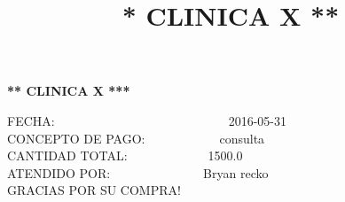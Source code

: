 \documentclass[10pt,a4paper]{letter}
\title{\bf ** CLINICA X **}
\begin{document}
\begin{center}
{\scshape\LARGE \bf *** CLINICA X ***\par}

\end{center}

FECHA:\ \ \ \ \ \ \ \ \ \ \ \ \ \ \ \ \ \ \ \ \ \ \ \ \ \ \ \ 2016-05-31 \\
CONCEPTO DE PAGO:\ \  \ \ \ \ \ \ \ \  \ \ consulta \\
CANTIDAD TOTAL:\ \ \ \ \ \ \ \ \ \ \ \ \ 1500.0 \\
ATENDIDO POR:\ \ \ \ \ \ \ \ \ \ \ \ \ \ \ Bryan recko \\
GRACIAS POR SU COMPRA! \\ \\

 
\end{document}
